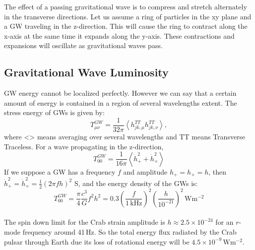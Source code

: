 \documentclass{ttuthes2007}
\begin{document}
	The effect of a passing gravitational wave is to compress and stretch
alternately in the transverse directions. Let us assume a ring of particles in
the xy
plane and a \ac{GW} traveling in the  z-direction. This will cause the
ring to contract along the x-axis at the same time it expands along the y-axis. These
contractions and expansions will oscillate as  gravitational waves pass. 

\subsection{Gravitational Wave Luminosity}
\ac{GW} energy cannot be localized perfectly.
However we can say that a certain amount of energy is contained in a region of
several wavelengths extent. The stress energy of \acp{GW} is given by:
\begin{equation}
T_{\mu\nu}^{GW} = \frac{1}{32\pi}\left\langle
h_{jk,\mu}^{TT}h_{jk,\nu}^{TT}\right\rangle,
\end{equation}
where <> means averaging over several wavelengths and TT means Transverse
Traceless.
For a wave propagating in the z-direction, 
\begin{equation}
T_{00}^{GW}=\frac{1}{16\pi}\left\langle\dot{h}_+^2+\dot{h}_\times
^2\right\rangle
\end{equation}
If we suppose a \ac{GW} has a frequency $f$ and amplitude $h_+ = h_\times = h$,
then $\dot{h}_+^2 = \dot{h}_\times^2 = \frac{1}{2}(2\pi fh)^2$
S, and the energy density of the \acp{GW} is:
\begin{equation}
T_{00}^{GW} = \frac{\pi}{4}\frac{c^3}{G}f^2
h^2=0.3\left(\frac{f}{1\,\mathrm{kHz}}\right )^2
\left(\frac{h}{10^{-21}}\right )^2\,\mathrm{Wm^{-2}}
\end{equation}
\\
The spin down limit for the Crab strain amplitude is $h\approx 2.5 \times
10^{-24}$ for an $r$-mode frequency around 41\,Hz. So the total energy flux
radiated by the Crab pulsar through Earth due its loss of rotational energy will be $4.5\times10^{-9}\,\mathrm{Wm^{-2}}$.
\end{document}
